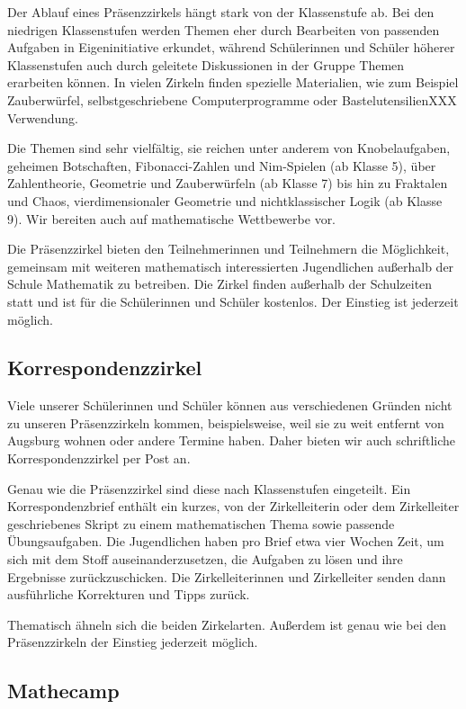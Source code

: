\documentclass[12pt]{zettel}
\begin{document}
Der Ablauf eines Präsenzzirkels hängt stark von der Klassenstufe ab. Bei den
niedrigen Klassenstufen werden Themen eher durch Bearbeiten von passenden
Aufgaben in Eigeninitiative erkundet, während Schülerinnen und Schüler höherer
Klassenstufen auch durch geleitete Diskussionen in der Gruppe
Themen erarbeiten können. In vielen Zirkeln finden spezielle Materialien,
wie zum Beispiel Zauberwürfel, selbstgeschriebene Computerprogramme oder
BastelutensilienXXX Verwendung.

Die Themen sind sehr vielfältig, sie reichen unter anderem von
Knobelaufgaben, geheimen Botschaften, Fibonacci-Zahlen und Nim-Spielen (ab Klasse 5),
über Zahlentheorie, Geometrie und Zauberwürfeln (ab Klasse 7) bis hin zu
Fraktalen und Chaos, vierdimensionaler Geometrie und nichtklassischer Logik
(ab Klasse 9). Wir bereiten auch auf mathematische Wettbewerbe vor. 

Die Präsenzzirkel bieten den Teilnehmerinnen und Teilnehmern die Möglichkeit,
gemeinsam mit weiteren mathematisch interessierten Jugendlichen außerhalb der
Schule Mathematik zu betreiben. Die Zirkel finden außerhalb der Schulzeiten
statt und ist für die Schülerinnen und Schüler kostenlos. Der Einstieg ist
jederzeit möglich.


\subsection{Korrespondenzzirkel}

Viele unserer Schülerinnen und Schüler können aus verschiedenen Gründen
nicht zu unseren Präsenzzirkeln kommen, beispielsweise, weil sie zu weit
entfernt von Augsburg wohnen oder andere Termine haben.
Daher bieten wir auch schriftliche Korrespondenzzirkel per Post
an.

Genau wie die Präsenzzirkel sind diese nach Klassenstufen eingeteilt. Ein
Korrespondenzbrief enthält ein kurzes, von der Zirkelleiterin oder dem
Zirkelleiter geschriebenes Skript zu einem mathematischen Thema sowie passende
Übungsaufgaben. Die Jugendlichen haben pro Brief etwa vier Wochen Zeit, um sich
mit dem Stoff auseinanderzusetzen, die Aufgaben zu lösen und ihre Ergebnisse
zurückzuschicken. Die Zirkelleiterinnen und Zirkelleiter senden dann
ausführliche Korrekturen und Tipps zurück.

Thematisch ähneln sich die beiden Zirkelarten. Außerdem ist genau wie bei den
Präsenzzirkeln der Einstieg jederzeit möglich.


\subsection{Mathecamp}
\end{document}
